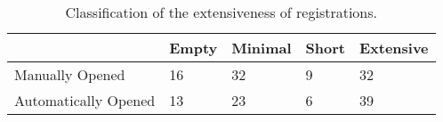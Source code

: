 \documentclass[
  ,jou, a4paper,floatsintext]{apa6}
\begin{document}
\begin{table*}[tbp]

\begin{center}
\begin{threeparttable}

\caption{\label{tab:table-quality}Classification of the extensiveness of registrations.}

\begin{tabular}{lllll}
\toprule
 & \multicolumn{1}{c}{Empty} & \multicolumn{1}{c}{Minimal} & \multicolumn{1}{c}{Short} & \multicolumn{1}{c}{Extensive}\\
\midrule
Manually Opened & 16 & 32 & 9 & 32\\
Automatically Opened & 13 & 23 & 6 & 39\\
\bottomrule
\end{tabular}

\end{threeparttable}
\end{center}

\end{table*}
\end{document}
